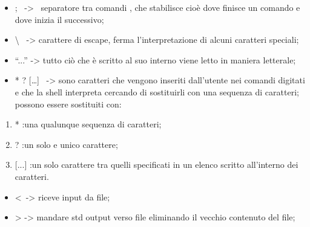 \documentclass[
]{article}
\providecommand{\tightlist}{%
  \setlength{\itemsep}{0pt}\setlength{\parskip}{0pt}}
\begin{document}
{}

\begin{itemize}
\tightlist
\item
  {; }{~-> ~separatore tra comandi , che stabilisce cioè dove finisce un
  comando e dove inizia il successivo;}
\end{itemize}

{}

\begin{itemize}
\tightlist
\item
  {\textbackslash{} }{~-> carattere di escape, ferma l'interpretazione di
  alcuni caratteri speciali;}
\end{itemize}

{}

\begin{itemize}
\tightlist
\item
  {``...'' }{-> tutto ciò che è scritto al suo interno viene letto in
  maniera letterale;}
\end{itemize}

{}

\begin{itemize}
\tightlist
\item
  {* ? {[}\ldots{]} ~}{-> sono caratteri che vengono inseriti dall'utente
  nei comandi digitati e che la shell interpreta cercando di sostituirli
  con una sequenza di caratteri; possono essere sostituiti con:}
\end{itemize}

\begin{enumerate}
\tightlist
\item
  {* :una qualunque sequenza di caratteri;}
\item
  {? :un solo e unico carattere;}
\item
  {{[}...{]} :un solo carattere tra quelli specificati in un elenco
  scritto all'interno dei caratteri.}
\end{enumerate}

{}

\begin{itemize}
\tightlist
\item
  {\textless{}}{~-> riceve input da file;}
\end{itemize}

{}

\begin{itemize}
\tightlist
\item
  {\textgreater{} }{-> mandare std output verso file eliminando il
  vecchio contenuto del file;}
\end{itemize}
\end{document}
